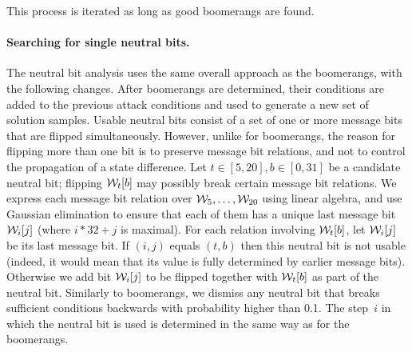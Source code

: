 This process is iterated as long as good boomerangs are found.

\paragraph{Searching for single neutral bits.}
The neutral bit analysis uses the same overall approach as the boomerangs, with the following changes.
After boomerangs are determined, their conditions are added to the previous attack conditions and used to generate a new set of solution samples.
Usable neutral bits consist of a set of one or more message bits that are flipped simultaneously.
However, unlike for boomerangs, the reason for flipping more than one bit is to preserve message bit relations, and not to control the
propagation of a state difference.
Let $t\in[5,20], b\in[0,31]$ be a candidate neutral bit; flipping $\mathcal{W}_t[b]$ may possibly break certain message bit relations.
We express each message bit relation over $\mathcal{W}_5,\ldots,\mathcal{W}_{20}$ using linear algebra, 
and use Gaussian elimination to ensure that each of them has a unique last message bit $\mathcal{W}_i[j]$ (\ie where $i*32+j$ is maximal).
For each relation involving $\mathcal{W}_t[b]$, let $\mathcal{W}_i[j]$ be its last message bit.
If $(i,j)$ equals $(t,b)$ then this neutral bit is not usable (indeed, it would mean that its value is fully determined by earlier message bits).
Otherwise we add bit $\mathcal{W}_i[j]$ to be flipped together with $\mathcal{W}_t[b]$ as part of the neutral bit.
Similarly to boomerangs, we dismiss any neutral bit that breaks sufficient conditions backwards with probability higher than 0.1.
The step~$i$ in which the neutral bit is used is determined in the same way as for the boomerangs.

